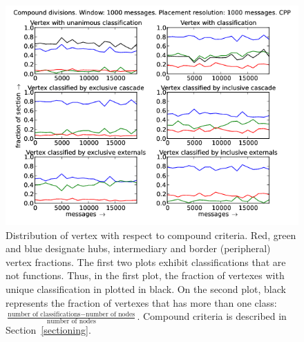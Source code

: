\documentclass[%
 aip,
 jmp,%
 amsmath,amssymb,
 reprint,%
]{revtex4-1}
\begin{document}
\begin{figure}[hbtp] 
   \centering
        \includegraphics[width=\textwidth]{figs/CPP/1000_2}
    \caption{Distribution of vertex with respect to compound criteria. Red, green and blue designate hubs, intermediary and border (peripheral) vertex fractions. The first two plots exhibit classifications that are not functions. Thus, in the first plot, the fraction of vertexes with unique classification in plotted in black. On the second plot, black represents the fraction of vertexes that has more than one class: $\frac{\text{number of classifications} - \text{number of nodes}}{\text{number of nodes}}$. Compound criteria is described in Section~\ref{sectioning}.}
    \label{fig:cpp1000_}
\end{figure}
\end{document}
